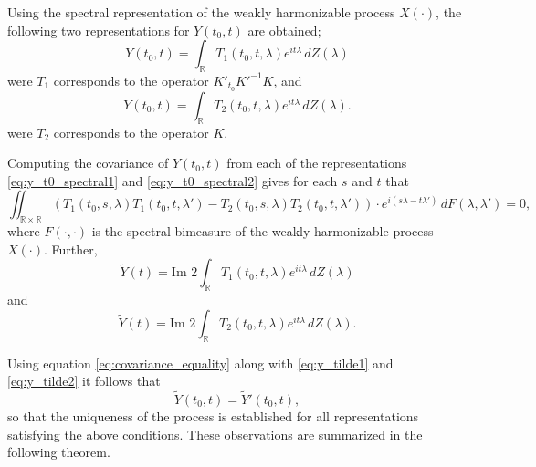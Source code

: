 \documentclass[12pt]{article}
\begin{document}
Using the spectral representation of the weakly harmonizable process $X(\cdot)$, the following two representations for $Y(t_0, t)$ are obtained;
\begin{equation}
    Y(t_0, t) = \int_{\mathbb{R}} T_1(t_0, t, \lambda) e^{it\lambda} \, dZ(\lambda)
    \label{eq:y_t0_spectral1}
\end{equation}
were $T_1$ corresponds to the operator $K'_{t_0} K'^{-1}K$, and
\begin{equation}
    Y(t_0, t) = \int_{\mathbb{R}} T_2(t_0, t, \lambda) e^{it\lambda} \, dZ(\lambda).
    \label{eq:y_t0_spectral2}
\end{equation}
were $T_2$ corresponds to the operator $K$.

Computing the covariance of $Y(t_0, t)$ from each of the representations \eqref{eq:y_t0_spectral1} and \eqref{eq:y_t0_spectral2} gives for each $s$ and $t$ that
\begin{equation}
    \iint_{\mathbb{R} \times \mathbb{R}} (T_1(t_0, s, \lambda) T_1(t_0, t, \lambda') - T_2(t_0, s, \lambda) T_2(t_0, t, \lambda'))
    \cdot e^{i(s\lambda-t\lambda')} \, dF(\lambda, \lambda') = 0,
    \label{eq:covariance_equality}
\end{equation}
where $F(\cdot,\cdot)$ is the spectral bimeasure of the weakly harmonizable process $X(\cdot)$. Further,
\begin{equation}
    \tilde{Y}(t) = \text{Im } 2 \int_{\mathbb{R}} T_1(t_0, t, \lambda) e^{it\lambda} \, dZ(\lambda)
    \label{eq:y_tilde1}
\end{equation}
and
\begin{equation}
    \tilde{Y}(t) = \text{Im } 2 \int_{\mathbb{R}} T_2(t_0, t, \lambda) e^{it\lambda} \, dZ(\lambda).
    \label{eq:y_tilde2}
\end{equation}

Using equation \eqref{eq:covariance_equality} along with \eqref{eq:y_tilde1} and \eqref{eq:y_tilde2} it follows that
\begin{equation}
    \tilde{Y}(t_0, t) = \tilde{Y}'(t_0, t),
    \label{eq:y_tilde_equality}
\end{equation}
so that the uniqueness of the process is established for all representations satisfying the above conditions. These observations are summarized in the following theorem.
\end{document}
